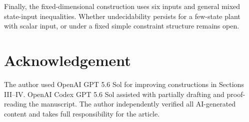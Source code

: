 \documentclass{IEEEtran}
\theoremstyle{remark}
\begin{document}
Finally, the fixed-dimensional construction uses six inputs and general mixed state-input inequalities.  Whether undecidability persists for a few-state plant with scalar input, or under a fixed simple constraint structure remains open.

\section*{Acknowledgement}
The author used OpenAI GPT 5.6 Sol for improving constructions in Sections III--IV. OpenAI Codex GPT 5.6 Sol assisted with partially drafting and proof-reading the manuscript. The author independently verified all AI-generated content and takes full responsibility for the article.



\end{document}
